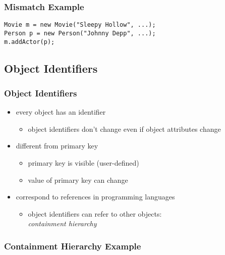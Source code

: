 \documentclass[dvipsnames]{beamer}
\theoremstyle{plain}
\begin{document}
\begin{frame}[fragile]
  \frametitle{Mismatch Example}

  \begin{example}
    \begin{lstlisting}
Movie m = new Movie("Sleepy Hollow", ...);
Person p = new Person("Johnny Depp", ...);
m.addActor(p);
    \end{lstlisting}
  \end{example}
\end{frame}

\subsection{Object Identifiers}

\begin{frame}
  \frametitle{Object Identifiers}

  \begin{itemize}
    \item every object has an identifier
    \begin{itemize}
      \item object identifiers don't change even if object attributes change
    \end{itemize}

    \pause
    \item different from primary key
    \begin{itemize}
      \item primary key is visible (user-defined)
      \item value of primary key can change
    \end{itemize}

    \pause
    \item correspond to references in programming languages
    \begin{itemize}
      \item object identifiers can refer to other objects:\\
        \emph{containment hierarchy}
    \end{itemize}
  \end{itemize}
\end{frame}

\begin{frame}
  \frametitle{Containment Hierarchy Example}

  \begin{example}
    \begin{center}
    \end{center}
  \end{example}
\end{frame}
\end{document}
